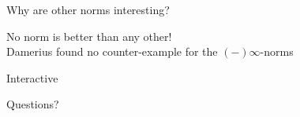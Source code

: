 \documentclass[11pt, british]{beamer}
\begin{document}
\begin{frame}{Why are other norms interesting?}

  No norm is better than any other! \\

  Damerius found no counter-example for the $(-)\infty$-norms \\

\end{frame}

\begin{frame}{Interactive}

\end{frame}

\begin{frame}{Questions?}

\end{frame}


\end{document}
